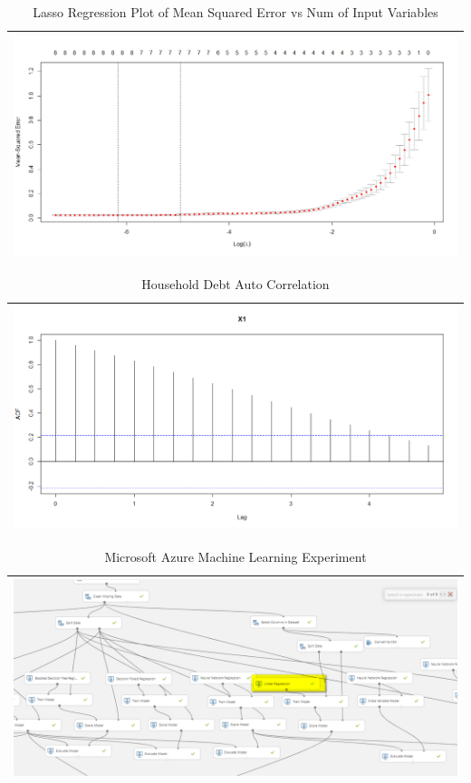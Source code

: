 \documentclass[sigconf,nonacm,11pt]{acmart}
\begin{document}
\begin{appendix}
\begin{table}[ht]
\caption{Lasso Regression Plot of Mean Squared Error vs Num of Input Variables}
\centering
\begin{tabular}{p{1.0\linewidth}}
\hline
\includegraphics[scale = 0.26]{LASSORegression_Plot.png}\\
\hline
\end{tabular}
\end{table}

\begin{table}[ht]
\caption{Household Debt Auto Correlation}
\centering
\begin{tabular}{p{1.0\linewidth}}
\hline
\includegraphics[scale = 0.26]{HouseholdDebtAutoCor.png}\\
\hline
\end{tabular}
\end{table}



\begin{table}[ht]
\caption{Microsoft Azure Machine Learning Experiment}
\centering
\begin{tabular}{p{1.0\linewidth}}
\hline
\includegraphics[scale = 0.46]{teamfed_azure_ml.png}\\
\hline
\end{tabular}
\end{table}



\end{appendix}
\end{document}
